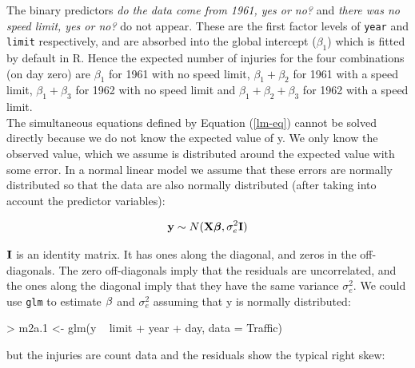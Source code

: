 \documentclass{article}
\begin{document}
The binary predictors \emph{do the data come from 1961, yes or no?} and \emph{there was no speed limit, yes or no?} do not appear. These are the first factor levels of \texttt{year} and \texttt{limit} respectively, and are absorbed into the global intercept ($\beta_{1}$) which is fitted by default in R.  Hence the expected number of injuries for the four combinations (on day zero) are $\beta_{1}$ for 1961 with no speed limit, $\beta_{1}+\beta_{2}$ for 1961 with a speed limit, $\beta_{1}+\beta_{3}$ for 1962 with no speed limit and  $\beta_{1}+\beta_{2}+\beta_{3}$ for 1962 with a speed limit.\\

The simultaneous equations defined by Equation (\ref{lm-eq}) cannot be solved directly because we do not know the expected value of y. We only know the observed value, which we assume is distributed around the expected value with some error. In a normal linear model we assume that these errors are normally distributed so that the data are also normally distributed (after taking into account the predictor variables):

\begin{equation}
{\bf y} \sim N({\bf X}{\bm \beta}, \sigma^{2}_{e}{\bf I})
\end{equation}	

${\bf I}$ is an identity matrix. It has ones along the diagonal, and zeros in the off-diagonals. The zero off-diagonals imply that the residuals are uncorrelated, and the ones along the diagonal imply that they have the same variance  $\sigma^{2}_{e}$. We could use \texttt{glm} to estimate ${\bf \beta}$ and  $\sigma^{2}_{e}$ assuming that y is normally distributed: 

\begin{Schunk}
\begin{Sinput}
> m2a.1 <- glm(y ~ limit + year + day, data = Traffic)
\end{Sinput}
\end{Schunk}

but the injuries are count data and the residuals show the typical right skew:

\iftalk
\else
\begin{Schunk}
\end{Schunk}
\fi
\end{document}
